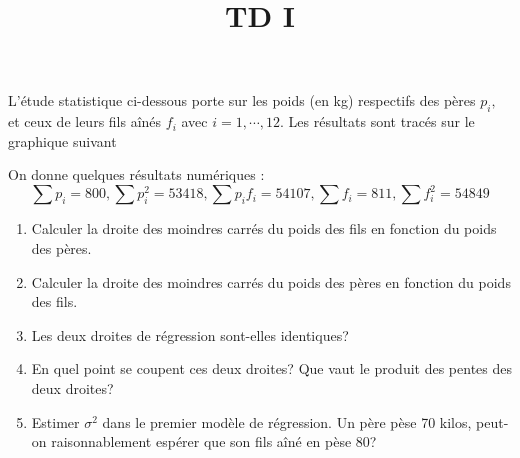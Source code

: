 \documentclass{td_um}
\title{TD I}
\providecommand{\1}{\mathds{1}}
\begin{document}
\maketitle

\exo{}
L'étude statistique ci-dessous porte sur les poids (en kg) respectifs des pères $p_{i},$ et ceux de leurs fils aînés $f_{i}$ avec $i=1,\cdots,12$. Les résultats sont tracés sur le graphique suivant

\begin{center}
\end{center}

On donne quelques résultats numériques :
$$
\sum p_{i}=800, \sum p_{i}^{2}=53418, \sum p_{i} f_{i}=54107, \sum f_{i}=811, \sum f_{i}^{2}=54849
$$
\begin{enumerate}
    \item  Calculer la droite des moindres carrés du poids des fils en fonction du poids des pères.
    \item  Calculer la droite des moindres carrés du poids des pères en fonction du poids des fils.
    \item  Les deux droites de régression sont-elles identiques?
    \item  En quel point se coupent ces deux droites? Que vaut le produit des pentes des deux droites?
    \item  Estimer $\sigma^{2}$ dans le premier modèle de régression. Un père pèse 70 kilos, peut-on raisonnablement espérer que son fils aîné en pèse $80$?
\end{enumerate}
\end{document}
